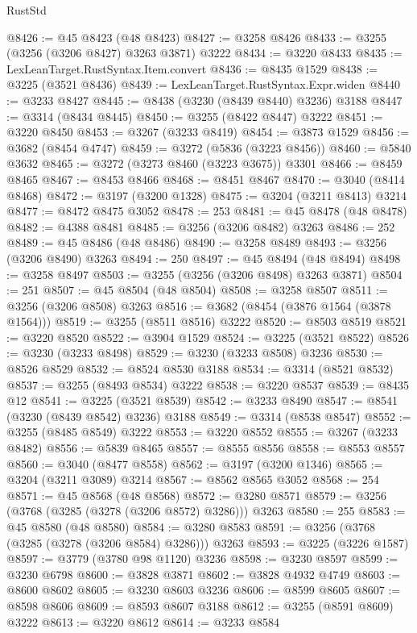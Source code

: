 \begin{lexlean}{RustStd}
\begin{coremodule}
{\begin{coremodule}
{{{{{{{{{{{{{{{{{{{{{{{{{{{{{{{{{{{{{@8426 := @45 @8423 (@48 @8423)
@8427 := @3258 @8426
@8433 := @3255 (@3256 (@3206 @8427) @3263 @3871) @3222
@8434 := @3220 @8433
@8435 := LexLeanTarget.RustSyntax.Item.convert
@8436 := @8435 @1529
@8438 := @3225 (@3521 @8436)
@8439 := LexLeanTarget.RustSyntax.Expr.widen
@8440 := @3233 @8427
@8445 := @8438 (@3230 (@8439 @8440) @3236) @3188
@8447 := @3314 (@8434 @8445)
@8450 := @3255 (@8422 @8447) @3222
@8451 := @3220 @8450
@8453 := @3267 (@3233 @8419)
@8454 := @3873 @1529
@8456 := @3682 (@8454 @4747)
@8459 := @3272 (@5836 (@3223 @8456))
@8460 := @5840 @3632
@8465 := @3272 (@3273 @8460 (@3223 @3675)) @3301
@8466 := @8459 @8465
@8467 := @8453 @8466
@8468 := @8451 @8467
@8470 := @3040 (@8414 @8468)
@8472 := @3197 (@3200 @1328)
@8475 := @3204 (@3211 @8413) @3214
@8477 := @8472 @8475 @3052
@8478 := 253
@8481 := @45 @8478 (@48 @8478)
@8482 := @4388 @8481
@8485 := @3256 (@3206 @8482) @3263
@8486 := 252
@8489 := @45 @8486 (@48 @8486)
@8490 := @3258 @8489
@8493 := @3256 (@3206 @8490) @3263
@8494 := 250
@8497 := @45 @8494 (@48 @8494)
@8498 := @3258 @8497
@8503 := @3255 (@3256 (@3206 @8498) @3263 @3871)
@8504 := 251
@8507 := @45 @8504 (@48 @8504)
@8508 := @3258 @8507
@8511 := @3256 (@3206 @8508) @3263
@8516 := @3682 (@8454 (@3876 @1564 (@3878 @1564)))
@8519 := @3255 (@8511 @8516) @3222
@8520 := @8503 @8519
@8521 := @3220 @8520
@8522 := @3904 @1529
@8524 := @3225 (@3521 @8522)
@8526 := @3230 (@3233 @8498)
@8529 := @3230 (@3233 @8508) @3236
@8530 := @8526 @8529
@8532 := @8524 @8530 @3188
@8534 := @3314 (@8521 @8532)
@8537 := @3255 (@8493 @8534) @3222
@8538 := @3220 @8537
@8539 := @8435 @12
@8541 := @3225 (@3521 @8539)
@8542 := @3233 @8490
@8547 := @8541 (@3230 (@8439 @8542) @3236) @3188
@8549 := @3314 (@8538 @8547)
@8552 := @3255 (@8485 @8549) @3222
@8553 := @3220 @8552
@8555 := @3267 (@3233 @8482)
@8556 := @5839 @8465
@8557 := @8555 @8556
@8558 := @8553 @8557
@8560 := @3040 (@8477 @8558)
@8562 := @3197 (@3200 @1346)
@8565 := @3204 (@3211 @3089) @3214
@8567 := @8562 @8565 @3052
@8568 := 254
@8571 := @45 @8568 (@48 @8568)
@8572 := @3280 @8571
@8579 := @3256 (@3768 (@3285 (@3278 (@3206 @8572) @3286))) @3263
@8580 := 255
@8583 := @45 @8580 (@48 @8580)
@8584 := @3280 @8583
@8591 := @3256 (@3768 (@3285 (@3278 (@3206 @8584) @3286))) @3263
@8593 := @3225 (@3226 @1587)
@8597 := @3779 (@3780 @98 @1120) @3236
@8598 := @3230 @8597
@8599 := @3230 @6798
@8600 := @3828 @3871
@8602 := @3828 @4932 @4749
@8603 := @8600 @8602
@8605 := @3230 @8603 @3236
@8606 := @8599 @8605
@8607 := @8598 @8606
@8609 := @8593 @8607 @3188
@8612 := @3255 (@8591 @8609) @3222
@8613 := @3220 @8612
@8614 := @3233 @8584
}}}}}}}}}}}}}}}}}}}}}}}}}}}}}}}}}}}}}
\end{coremodule}}
\end{coremodule}
\end{lexlean}
